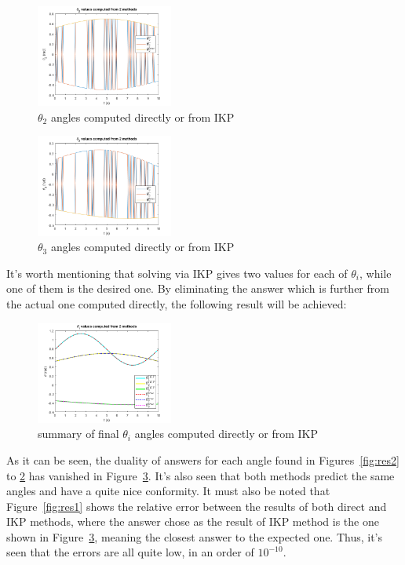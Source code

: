\documentclass[conference]{IEEEtran}
\begin{document}
\begin{figure}[htbp]
    \centerline{\includegraphics[width=0.4\textwidth]{figures/prob1c.png}}
    \caption{$\theta_2$ angles computed directly or from IKP}
    \label{fig:res3}
\end{figure}

\begin{figure}[H]
    \centerline{\includegraphics[width=0.4\textwidth]{figures/prob1d.png}}
    \caption{$\theta_3$ angles computed directly or from IKP}
    \label{fig:res4}
\end{figure}

It's worth mentioning that solving via IKP gives two values for each of $\theta_i$, while one of them is the desired one. By eliminating the answer which is further from the actual one computed directly, the following result will be achieved:

\begin{figure}[H]
    \centerline{\includegraphics[width=0.4\textwidth]{figures/prob1e.png}}
    \caption{summary of final $\theta_i$ angles computed directly or from IKP}
    \label{fig:res5}
\end{figure}

As it can be seen, the duality of answers for each angle found in Figures~\ref{fig:res2} to \ref{fig:res4} has vanished in Figure~\ref{fig:res5}. It's also seen that both methods predict the same angles and have a quite nice conformity. It must also be noted that Figure~\ref{fig:res1} shows the relative error between the results of both direct and IKP methods, where the answer chose as the result of IKP method is the one shown in Figure~\ref{fig:res5}, meaning the closest answer to the expected one. Thus, it's seen that the errors are all quite low, in an order of $10^{-10}$.
\vspace{10px}
\end{document}
